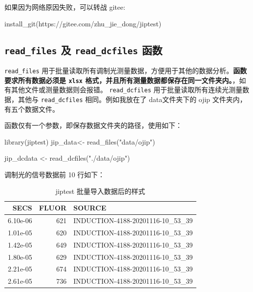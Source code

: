 \documentclass[
]{krantz}
\makeatletter
\newenvironment{Shaded}{\begin{snugshade}}{\end{snugshade}}
\newcommand{\FunctionTok}[1]{\textcolor[rgb]{0.00,0.00,0.00}{#1}}
\newcommand{\NormalTok}[1]{#1}
\newcommand{\OtherTok}[1]{\textcolor[rgb]{0.56,0.35,0.01}{#1}}
\newcommand{\StringTok}[1]{\textcolor[rgb]{0.31,0.60,0.02}{#1}}
\newenvironment{kframe}{%
\medskip{}
\setlength{\fboxsep}{.8em}
 \def\at@end@of@kframe{}%
 \ifinner\ifhmode%
  \def\at@end@of@kframe{\end{minipage}}%
  \begin{minipage}{\columnwidth}%
 \fi\fi%
 \def\FrameCommand##1{\hskip\@totalleftmargin \hskip-\fboxsep
 \colorbox{shadecolor}{##1}\hskip-\fboxsep
     \hskip-\linewidth \hskip-\@totalleftmargin \hskip\columnwidth}%
 \MakeFramed {\advance\hsize-\width
   \@totalleftmargin\z@ \linewidth\hsize
   \@setminipage}}%
 {\par\unskip\endMakeFramed%
 \at@end@of@kframe}
\renewenvironment{Shaded}{\begin{kframe}}{\end{kframe}}
\makeatother
\begin{document}
如果因为网络原因失败，可以转战 gitee:

\begin{Shaded}
\begin{Highlighting}[]
\FunctionTok{install\_git}\NormalTok{(}\StringTok{\textquotesingle{}https://gitee.com/zhu\_jie\_dong/jiptest\textquotesingle{}}\NormalTok{)}
\end{Highlighting}
\end{Shaded}

\hypertarget{readfluor}{%
\subsection{\texorpdfstring{\texttt{read\_files} 及 \texttt{read\_dcfiles} 函数}{read\_files 及 read\_dcfiles 函数}}\label{readfluor}}

\texttt{read\_files} 用于批量读取所有调制光测量数据，方便用于其他的数据分析。\textbf{函数要求所有数据必须是 \texttt{xlsx} 格式，并且所有测量数据都保存在同一文件夹内。}，如有其他文件或测量数据则会报错。
\texttt{read\_dcfiles} 用于批量读取所有连续光测量数据，其他与 \texttt{read\_dcfiles} 相同。例如我放在了 data文件夹下的 ojip 文件夹内，有五个数据文件。

函数仅有一个参数，即保存数据文件夹的路径，使用如下：

\begin{Shaded}
\begin{Highlighting}[]
\FunctionTok{library}\NormalTok{(jiptest)}
\NormalTok{jip\_data}\OtherTok{\textless{}{-}} \FunctionTok{read\_files}\NormalTok{(}\StringTok{"data/ojip"}\NormalTok{)}
\end{Highlighting}
\end{Shaded}

\begin{Shaded}
\begin{Highlighting}[]
\NormalTok{jip\_dcdata }\OtherTok{\textless{}{-}} \FunctionTok{read\_dcfiles}\NormalTok{(}\StringTok{"./data/ojip"}\NormalTok{)}
\end{Highlighting}
\end{Shaded}

调制光的信号数据前 10 行如下：

\begin{table}

\caption{\label{tab:unnamed-chunk-67}jiptest 批量导入数据后的样式}
\centering
\begin{tabular}[t]{rrl}
\toprule
SECS & FLUOR & SOURCE\\
\midrule
6.10e-06 & 621 & INDUCTION-4188-20201116-10\_53\_39\\
1.01e-05 & 620 & INDUCTION-4188-20201116-10\_53\_39\\
1.42e-05 & 649 & INDUCTION-4188-20201116-10\_53\_39\\
1.80e-05 & 629 & INDUCTION-4188-20201116-10\_53\_39\\
2.21e-05 & 674 & INDUCTION-4188-20201116-10\_53\_39\\
\addlinespace
2.61e-05 & 736 & INDUCTION-4188-20201116-10\_53\_39\\
\bottomrule
\end{tabular}
\end{table}
\end{document}

